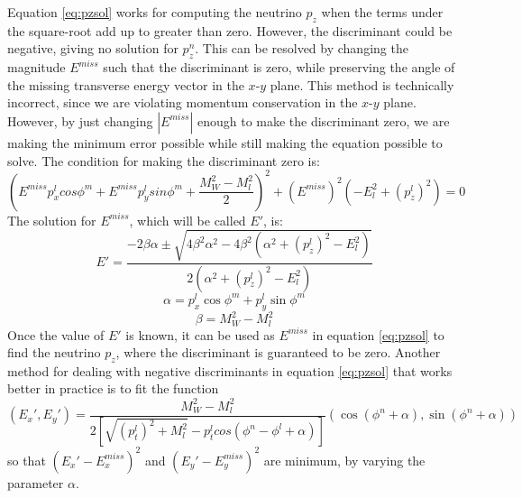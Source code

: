 \documentclass[10pt]{ucscthesisbs}
\begin{document}
Equation \ref{eq:pzsol} works for computing the neutrino $p_z$ when the terms under the square-root add up to greater than zero. However, the discriminant could be negative, giving no solution for $p_z^n$. This can be resolved by changing the magnitude $E^{miss}$ such that the discriminant is zero, while preserving the angle of the missing transverse energy vector in the $x$-$y$ plane. This method is technically incorrect, since we are violating momentum conservation in the $x$-$y$ plane. However, by just changing $|E^{miss}|$ enough to make the discriminant zero, we are making the minimum error possible while still making the equation possible to solve. 
The condition for making the discriminant zero is:
\begin{equation}
(E^{miss}p_x^lcos{\phi^m} + E^{miss}p_y^lsin{\phi^m} + \frac{M_W^2 - M_l^2}{2})^2 + (E^{miss})^2(-E_l^2 + (p_z^l)^2) = 0 
\end{equation}
The solution for $E^{miss}$, which will be called $E'$, is: 
\begin{equation} \label{eq:metcorrection}
E' = \frac{-2\beta\alpha \pm \sqrt{4\beta^2\alpha^2 - 4\beta^2(\alpha^2 + (p_z^l)^2 - E_l^2)}}{2(\alpha^2 + (p_z^l)^2 - E_l^2)}
\end{equation}
\begin{equation} \alpha = p_x^l\cos{\phi^m} + p_y^l\sin{\phi^m} \end{equation}
\begin{equation} \beta = M_W^2 - M_l^2 \end{equation}
Once the value of $E'$ is known, it can be used as $E^{miss}$ in equation \ref{eq:pzsol} to find the neutrino $p_z$, where the discriminant is guaranteed to be zero. Another method for dealing with negative discriminants in equation \ref{eq:pzsol} that works better in practice is to fit the function
\begin{equation} \label{eq:metfit}
(E_x', E_y') = \frac{M_W^2 - M_l^2}{2[\sqrt{(p_t^l)^2 + M_l^2} - p_t^lcos{(\phi^n - \phi^l + \alpha)}]} (\cos{(\phi^n + \alpha)}, \sin{(\phi^n + \alpha)})
\end{equation}
so that $(E_x' - E^{miss}_x)^2$ and $(E_y' - E^{miss}_y)^2$ are minimum, by varying the parameter $\alpha$. \cite{nik}
\end{document}
